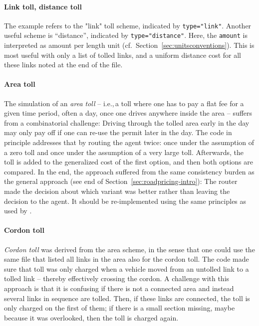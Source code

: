 \paragraph{Link toll, distance toll} The example refers to the "link" toll scheme, indicated by \lstinline$type="link"$. Another useful scheme is ``distance'', indicated by \lstinline$type="distance"$.  Here, the \lstinline$amount$ is interpreted as amount per length unit (cf.\ Section~\ref{sec:unitsconventions}).   This is most useful with only a list of tolled links, and a uniform distance cost for all these links noted at the end of the file.

\paragraph{Area toll} The simulation of an \emph{area toll} -- i.e.,\,a toll where one has to pay a flat fee for a given time period, often a day, once one drives anywhere inside the area -- suffers from a combinatorial challenge: Driving through the tolled area early in the day may only pay off if one can re-use the permit later in the day.  The code in principle addresses that by routing the agent twice: once under the assumption of a zero toll and once under the assumption of a very large toll.  Afterwards, the toll is added to the generalized cost of the first option, and then both options are compared.  
%
In the end, the approach suffered from the same consistency burden as the general approach (see end of Section~\ref{sec:roadpricing-intro}): The router made the decision about which variant was better rather than leaving the decision to the agent. It should be re-implemented using the same principles as used by \citet{NagelEtAl_PCS_2014}.

\paragraph{Cordon toll}

\emph{Cordon toll} was derived from the area scheme, in the sense that one could use the same file that listed all links in the area also for the cordon toll.  The code made sure that toll was only charged when a vehicle moved from an untolled link to a tolled link -- thereby effectively crossing the cordon.  A challenge with this approach is that it is confusing if there is not a connected area and instead several links in sequence are tolled.  Then, if these links are connected, the toll is only charged on the first of them; if there is a small section missing, maybe because it was overlooked, then the toll is charged again. 


